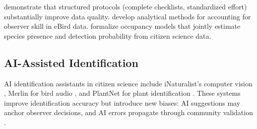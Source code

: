 \citet{kelling2015can} demonstrate that structured protocols (complete
checklists, standardized effort) substantially improve data quality.
\citet{johnston2020analytical} develop analytical methods for
accounting for observer skill in eBird data. \citet{isaac2014statistics}
formalize occupancy models that jointly estimate species presence
and detection probability from citizen science data.

\subsection{AI-Assisted Identification}

AI identification assistants in citizen science include iNaturalist's
computer vision \citep{van2021benchmarking}, Merlin for bird audio
\citep{kahl2021birdnet}, and PlantNet for plant identification
\citep{goeau2022overview}. These systems improve identification accuracy
but introduce new biases: AI suggestions may anchor observer decisions,
and AI errors propagate through community validation
\citep{terry2020think}.



